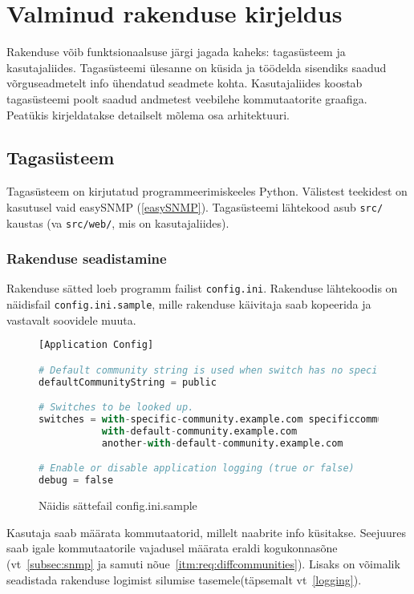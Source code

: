 \documentclass[12pt]{article}
\begin{document}
\newpage
\section{Valminud rakenduse kirjeldus}
Rakenduse võib funktsionaalsuse järgi jagada kaheks: tagasüsteem ja kasutajaliides.
Tagasüsteemi ülesanne on küsida ja töödelda sisendiks saadud võrguseadmetelt info ühendatud
seadmete kohta.
Kasutajaliides koostab tagasüsteemi poolt saadud andmetest veebilehe kommutaatorite graafiga.
Peatükis kirjeldatakse detailselt mõlema osa arhitektuuri.

\subsection{Tagasüsteem}
Tagasüsteem on kirjutatud programmeerimiskeeles Python.
Välistest teekidest on kasutusel vaid easySNMP (\ref{easySNMP}).
Tagasüsteemi lähtekood asub \texttt{src/} kaustas (va \texttt{src/web/}, mis on kasutajaliides).

\subsubsection{Rakenduse seadistamine}
Rakenduse sätted loeb programm failist \texttt{config.ini}.
Rakenduse lähtekoodis on näidisfail \texttt{config.ini.sample}, mille rakenduse käivitaja
saab kopeerida ja vastavalt soovidele muuta.

\begin{figure} [htb]
\begin{lstlisting}[language=Python]
[Application Config]

# Default community string is used when switch has no specific community string set
defaultCommunityString = public

# Switches to be looked up.
switches = with-specific-community.example.com specificcommunity
           with-default-community.example.com
           another-with-default-community.example.com

# Enable or disable application logging (true or false)
debug = false
\end{lstlisting}
\caption{Näidis sättefail config.ini.sample}
\end{figure}

Kasutaja saab määrata kommutaatorid, millelt naabrite info küsitakse.
Seejuures saab igale kommutaatorile vajadusel määrata eraldi kogukonnasõne (vt~\ref{subsec:snmp}
ja samuti nõue~\ref{itm:req:diffcommunities}).
Lisaks on võimalik seadistada rakenduse logimist silumise tasemele(täpsemalt vt~\ref{logging}).
\end{document}
